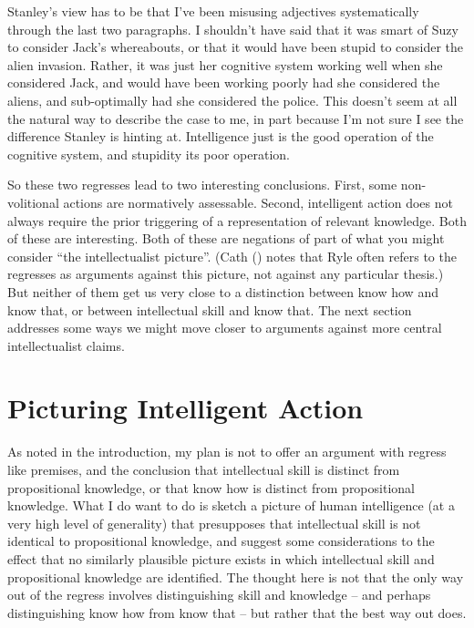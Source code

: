 \documentclass[
  10pt,
  letterpaper,
  DIV=11,
  numbers=noendperiod,
  twoside]{scrartcl}
\begin{document}
Stanley's view has to be that I've been misusing adjectives
systematically through the last two paragraphs. I shouldn't have said
that it was smart of Suzy to consider Jack's whereabouts, or that it
would have been stupid to consider the alien invasion. Rather, it was
just her cognitive system working well when she considered Jack, and
would have been working poorly had she considered the aliens, and
sub-optimally had she considered the police. This doesn't seem at all
the natural way to describe the case to me, in part because I'm not sure
I see the difference Stanley is hinting at. Intelligence just is the
good operation of the cognitive system, and stupidity its poor
operation.

So these two regresses lead to two interesting conclusions. First, some
non-volitional actions are normatively assessable. Second, intelligent
action does not always require the prior triggering of a representation
of relevant knowledge. Both of these are interesting. Both of these are
negations of part of what you might consider ``the intellectualist
picture''. (Cath () notes that Ryle often
refers to the regresses as arguments against this picture, not against
any particular thesis.) But neither of them get us very close to a
distinction between know how and know that, or between intellectual
skill and know that. The next section addresses some ways we might move
closer to arguments against more central intellectualist claims.

\section{Picturing Intelligent
Action}\label{picturing-intelligent-action}

As noted in the introduction, my plan is not to offer an argument with
regress like premises, and the conclusion that intellectual skill is
distinct from propositional knowledge, or that know how is distinct from
propositional knowledge. What I do want to do is sketch a picture of
human intelligence (at a very high level of generality) that presupposes
that intellectual skill is not identical to propositional knowledge, and
suggest some considerations to the effect that no similarly plausible
picture exists in which intellectual skill and propositional knowledge
are identified. The thought here is not that the only way out of the
regress involves distinguishing skill and knowledge -- and perhaps
distinguishing know how from know that -- but rather that the best way
out does.
\end{document}
